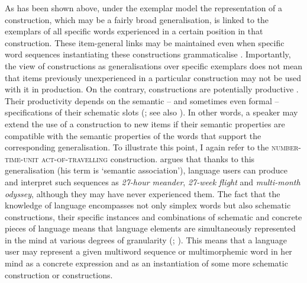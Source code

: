 As has been shown above, under the exemplar model the representation of a construction, which may be a fairly broad generalisation, is linked to the exemplars of all specific words experienced in a certain position in that construction. These item-general links may be maintained even when specific word sequences instantiating these constructions grammaticalise \citep{torres-walker-2009}. Importantly, the view of constructions as generalisations over specific exemplars does not mean that items previously unexperienced in a particular construction may not be used with it in production. On the contrary, constructions are potentially productive \citep{goldberg-2006,lieven-2010}. Their productivity depends on the  semantic -- and sometimes even formal -- specifications of their schematic slots (\citealt[57-59]{bybee-cxg-2013}; see also \citealt{zeschel-2010}). In other words, a speaker may extend the use of a construction to new items if their semantic properties are compatible with the semantic properties of the words that support the corresponding generalisation. To illustrate this point, I again refer to the \textsc{number-time-unit act-of-travelling} construction. \citet{hoey-lexical-2005} argues that thanks to this generalisation (his term is `semantic association'), language users can produce and interpret such sequences as \textit{27-hour meander}, \textit{27-week flight} and \textit{multi-month odyssey}, although they may have never experienced them. The fact that the knowledge of language encompasses not only simplex words but also schematic constructions, their specific instances and combinations of schematic and concrete pieces of language means that language elements are simultaneously represented in the mind at various degrees of granularity (\citealt{goldberg-2006,bybee-repetition-2006,tomasello-constructing-2003}; \citealt[see][pp. 63--76 for the view of grammar as a structured inventory of linguistic units]{langacker-foundations-1987}). This means that a language user may represent a given multiword sequence or multimorphemic word in her mind as a concrete expression and as an instantiation of some more schematic construction or constructions. 

